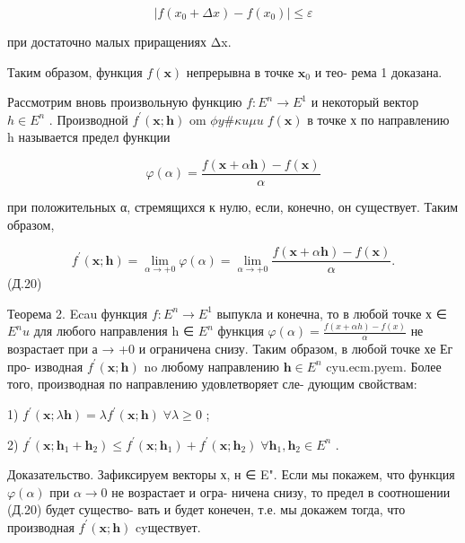 \documentclass[8pt]{extarticle}
\begin{document}
\[
\left| {f\left( {{x}_{0} + {\Delta x}}\right)  - f\left( {x}_{0}\right) }\right|  \leq  \varepsilon
\]

при достаточно малых приращениях Δx.

Таким образом, функция \(f\left( \mathbf{x}\right)\) непрерывна в точке \({\mathbf{x}}_{0}\) и тео- рема 1 доказана.

Рассмотрим вновь произвольную функцию \(f : {E}^{n} \rightarrow  {E}^{1}\) и некоторый вектор \(h \in  {E}^{n}\) . Производной \({f}^{\prime }\left( {\mathbf{x};\mathbf{h}}\right)\) om \({\phi y}\# {\kappa u\mu u} \; f\left( \mathbf{x}\right)\) в точке х по направлению h называется предел функции

\[
\varphi \left( \alpha \right)  = \frac{f\left( {\mathbf{x} + \alpha \mathbf{h}}\right)  - f\left( \mathbf{x}\right) }{\alpha }
\]

при положительных α, стремящихся к нулю, если, конечно, он существует. Таким образом,

\[
{f}^{\prime }\left( {\mathbf{x};\mathbf{h}}\right)  = \mathop{\lim }\limits_{{\alpha  \rightarrow   + 0}}\varphi \left( \alpha \right)  = \mathop{\lim }\limits_{{\alpha  \rightarrow   + 0}}\frac{f\left( {\mathbf{x} + \alpha \mathbf{h}}\right)  - f\left( \mathbf{x}\right) }{\alpha }.
\]
 (Д.20)

Теорема 2. Ecau функция \(f : {E}^{n} \rightarrow  {E}^{1}\) выпукла и конечна, то в любой точке х ∈ \({E}^{n}u\) для любого направления h ∈ \({E}^{n}\) функция \(\varphi \left( \alpha \right)  = \frac{f\left( {x + {\alpha h}}\right)  - f\left( x\right) }{\alpha }\) не возрастает при а → +0 и ограничена снизу. Таким образом, в любой точке хе Ег про- изводная \({f}^{\prime }\left( {\mathbf{x};\mathbf{h}}\right)\) no любому направлению \(\mathbf{h} \in  {E}^{n}\) cyu.ecm.pyem. Более того, производная по направлению удовлетворяет сле- дующим свойствам:

1) \({f}^{\prime }\left( {\mathbf{x};\lambda \mathbf{h}}\right)  = \lambda {f}^{\prime }\left( {\mathbf{x};\mathbf{h}}\right) \;\forall \lambda  \geq  0\) ;

2) \({f}^{\prime }\left( {\mathbf{x};{\mathbf{h}}_{1} + {\mathbf{h}}_{2}}\right)  \leq  {f}^{\prime }\left( {\mathbf{x};{\mathbf{h}}_{1}}\right)  + {f}^{\prime }\left( {\mathbf{x};{\mathbf{h}}_{2}}\right) \;\forall {\mathbf{h}}_{1},{\mathbf{h}}_{2} \in  {E}^{n}\) .

Доказательство. Зафиксируем векторы х, н ∈ E". Если мы покажем, что функция \(\varphi \left( \alpha \right)\) при \(\alpha  \rightarrow  0\) не возрастает и огра- ничена снизу, то предел в соотношении (Д.20) будет существо- вать и будет конечен, т.е. мы докажем тогда, что производная \({f}^{\prime }\left( {\mathbf{x};\mathbf{h}}\right)\) cyществует.
\end{document}
